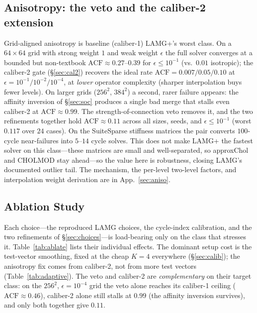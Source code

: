 \documentclass{siamart220329}
\newcommand{\acf}{\mathrm{ACF}}
\begin{document}
\subsection{Anisotropy: the veto and the caliber-2 extension}\label{sec:aniso-results}
Grid-aligned anisotropy is baseline (caliber-1) LAMG+'s worst class. On a $64\times64$ grid with
strong weight $1$ and weak weight $\epsilon$ the full solver converges at a bounded but
non-textbook $\acf\approx0.27$--$0.39$ for $\epsilon\le10^{-1}$ (vs.\ $0.01$ isotropic); the
caliber-2 gate (\S\ref{sec:cal2}) recovers the ideal rate $\acf=0.007/0.05/0.10$ at
$\epsilon=10^{-1}/10^{-2}/10^{-4}$, at \emph{lower} operator complexity (sharper interpolation
buys fewer levels). On larger grids ($256^2$, $384^2$) a second, rarer failure appears:
the affinity inversion of \S\ref{sec:soc} produces a single bad merge that stalls even caliber-2
at $\acf\approx0.99$. The strength-of-connection veto removes it, and the two refinements together
hold $\acf\approx0.11$ across all sizes, seeds, and $\epsilon\le10^{-1}$ (worst $0.117$ over $24$
cases). On the SuiteSparse stiffness matrices the pair converts $100$-cycle near-failures into
$5$--$14$ cycle solves. This does not make LAMG+ the fastest solver on this class---these
matrices are small and well-separated, so approxChol and CHOLMOD stay ahead---so the
value here is robustness, closing LAMG's documented outlier tail. The
mechanism, the per-level two-level factors, and interpolation weight derivation are in App.~\ref{sec:aniso}.

\subsection{Ablation Study}\label{sec:ablation}
Each choice---the reproduced LAMG choices, the cycle-index calibration, and the two refinements
of \S\ref{sec:choices}---is load-bearing only on the class that stresses it. Table~\ref{tab:ablate}
lists their individual effects. The dominant setup cost is the test-vector smoothing, fixed at the cheap
$K{=}4$ everywhere (\S\ref{sec:calib}); the anisotropy fix comes from caliber-2, not from more test
vectors (Table~\ref{tab:adaptive}). The veto and
caliber-2 are \emph{complementary} on their target class: on the $256^2$, $\epsilon=10^{-4}$ grid
the veto alone reaches its caliber-1 ceiling ($\acf\approx0.46$), caliber-2 alone still stalls at
$0.99$ (the affinity inversion survives), and only both together give $0.11$.
\end{document}
